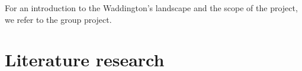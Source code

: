 \documentclass[journal, a4paper]{IEEEtran}
\begin{document}
For an introduction to the Waddington's landscape and the scope of the project, we refer to the group project.




	

%
%

\section{Literature research}


\end{document}
